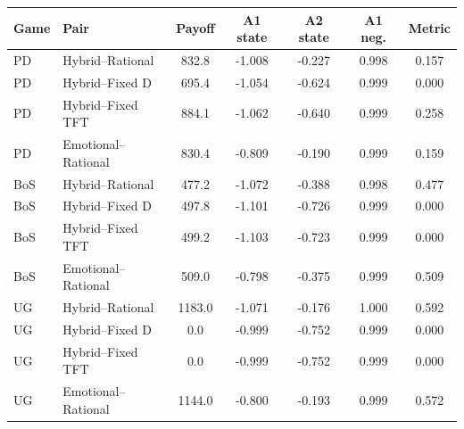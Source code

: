 \begin{tabular}{llccccc}
\toprule
Game & Pair & Payoff & A1 state & A2 state & A1 neg. & Metric \\ 
\midrule
PD & Hybrid--Rational & 832.8 & -1.008 & -0.227 & 0.998 & 0.157 \\ 
PD & Hybrid--Fixed D & 695.4 & -1.054 & -0.624 & 0.999 & 0.000 \\ 
PD & Hybrid--Fixed TFT & 884.1 & -1.062 & -0.640 & 0.999 & 0.258 \\ 
PD & Emotional--Rational & 830.4 & -0.809 & -0.190 & 0.999 & 0.159 \\ 
\midrule
BoS & Hybrid--Rational & 477.2 & -1.072 & -0.388 & 0.998 & 0.477 \\ 
BoS & Hybrid--Fixed D & 497.8 & -1.101 & -0.726 & 0.999 & 0.000 \\ 
BoS & Hybrid--Fixed TFT & 499.2 & -1.103 & -0.723 & 0.999 & 0.000 \\ 
BoS & Emotional--Rational & 509.0 & -0.798 & -0.375 & 0.999 & 0.509 \\ 
\midrule
UG & Hybrid--Rational & 1183.0 & -1.071 & -0.176 & 1.000 & 0.592 \\ 
UG & Hybrid--Fixed D & 0.0 & -0.999 & -0.752 & 0.999 & 0.000 \\ 
UG & Hybrid--Fixed TFT & 0.0 & -0.999 & -0.752 & 0.999 & 0.000 \\ 
UG & Emotional--Rational & 1144.0 & -0.800 & -0.193 & 0.999 & 0.572 \\ 
\bottomrule
\end{tabular}
